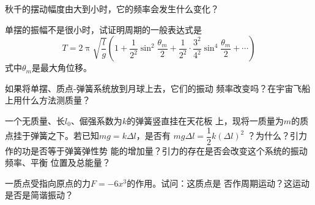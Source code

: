 \begin{questions}
  \question 秋千的摆动幅度由大到小时，它的频率会发生什么变化？

  \question 单摆的振幅不是很小时，试证明周期的一般表达式是
  {\setlength{\mathindent}{4em}
  \begin{equation*}
    T = 2 \uppi \sqrt { \frac { l } { g } } \left( 1 + \frac { 1 } { 2 ^ { 2 } } \sin ^ { 2 } \frac { \theta _ { m } } { 2 } + \frac { 1 } { 2 ^ { 2 } } \cdot \frac { 3 ^ { 2 } } { 4 ^ { 2 } } \sin ^ { 4 } \frac { \theta _ { m } } { 2 } + \cdots \right)
  \end{equation*}}
  式中$ \theta _ { m } $是最大角位移。

  \question 如果将单摆、质点-弹簧系统放到月球上去，它们的振动
  频率改变吗？在宇宙飞船上用什么方法测质量？

  \question 一个无质量、长$ l _ { 0 } $、倔强系数为$ k $的弹簧竖直挂在天花板
  上，现将一质量为$ m $的质点挂于弹簧之下。若已知$ m g = k \Delta l $，是否有
  $ m g \Delta l = \dfrac { 1 } { 2 } k \left( \Delta l \right) ^ { 2 } $
  ？为什么？引力作的功是否等于弹簧弹性势
  能的增加量？引力的存在是否会改变这个系统的振动频率、平衡
  位置及总能量？

  \question 一质点受指向原点的力$ F = - 6 x ^ { 3 } $的作用。试问：这质点是
  否作周期运动？这运动是否是简谐振动？

\end{questions}
